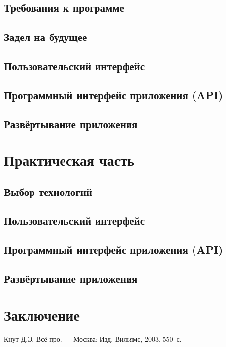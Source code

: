 \documentclass[14pt,a4paper]{scrartcl}
\begin{document}
    \subsection[Требования к программе]{Требования к программе}
    \subsection[Новизна]{Задел на будущее}
    \subsection[Пользовательский интерфейс]{Пользовательский интерфейс}
    \subsection[Программный интерфейс приложения]{Программный интерфейс приложения (API)}
    \subsection[Развёртывание приложения]{Развёртывание приложения}

    \newpage
    \section[Практическая часть]{Практическая часть}
    \subsection[Выбор технологий]{Выбор технологий}
    \subsection[Пользовательский интерфейс]{Пользовательский интерфейс}
    \subsection[Программный интерфейс приложения]{Программный интерфейс приложения (API)}
    \subsection[Развёртывание приложения]{Развёртывание приложения}

    \newpage
    \section[Заключение]{Заключение}

    \newpage
    \begin{thebibliography}{9}
        Кнут Д.Э. Всё про. \newblock --- Москва: Изд. Вильямс, 2003. 550~с.
    \end{thebibliography}
\end{document}
